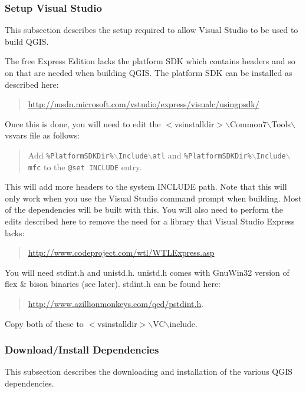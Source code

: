\hypertarget{toc76}{}
\subsubsection{Setup Visual Studio}
This subsection describes the setup required to allow Visual Studio to be used to build QGIS. 

\hypertarget{toc77}{}
The free Express Edition lacks the platform SDK which contains headers and so on that are needed when building QGIS. The platform SDK can be installed as described here:

	\begin{quotation}
\url{http://msdn.microsoft.com/vstudio/express/visualc/usingpsdk/}
	\end{quotation}
Once this is done, you will need to edit the $<$vsinstalldir$>$$\backslash$Common7$\backslash$Tools$\backslash$vsvars file as follows:

	\begin{quotation}
Add \texttt{\%PlatformSDKDir\%$\backslash$Include$\backslash$atl} and \texttt{\%PlatformSDKDir\%$\backslash$Include$\backslash$mfc} to the \texttt{@set INCLUDE} entry.
	\end{quotation}
This will add more headers to the system INCLUDE path. Note that this will only work when you use the Visual Studio command prompt when building. Most of the dependencies will be built with this.
You will also need to perform the edits described here to remove the need for a library that Visual Studio Express lacks:

	\begin{quotation}
\url{http://www.codeproject.com/wtl/WTLExpress.asp}
	\end{quotation}

\hypertarget{toc78}{}
You will need stdint.h and unistd.h. unistd.h comes with GnuWin32 version of flex \& bison binaries (see later). stdint.h can be found here:

	\begin{quotation}
\url{http://www.azillionmonkeys.com/qed/pstdint.h}.
	\end{quotation}
Copy both of these to $<$vsinstalldir$>$$\backslash$VC$\backslash$include.

\hypertarget{toc79}{}
\subsubsection{Download/Install Dependencies}
This subsection describes the downloading and installation of the various QGIS dependencies.


